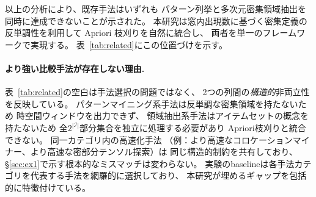 以上の分析により、既存手法はいずれも
パターン列挙と多次元密集領域抽出を同時に達成できないことが示された。
本研究は窓内出現数に基づく密集定義の反単調性を利用して
Apriori 枝刈りを自然に統合し、
両者を単一のフレームワークで実現する。
表~\ref{tab:related}にこの位置づけを示す。

\paragraph{より強い比較手法が存在しない理由.}
表~\ref{tab:related}の空白は手法選択の問題ではなく、
2つの列間の\emph{構造的}非両立性を反映している。
パターンマイニング系手法は反単調な密集領域を持たないため
時空間ウィンドウを出力できず、
領域抽出系手法はアイテムセットの概念を持たないため
全$2^{|\mathcal{I}|}$部分集合を独立に処理する必要があり
Apriori枝刈りと統合できない。
同一カテゴリ内の高速化手法
（例：より高速なコロケーションマイナー、より高速な密部分テンソル探索）は
同じ構造的制約を共有しており、
\S\ref{sec:ex1}で示す根本的なミスマッチは変わらない。
実験のbaselineは各手法カテゴリを代表する手法を網羅的に選択しており、
本研究が埋めるギャップを包括的に特徴付けている。

